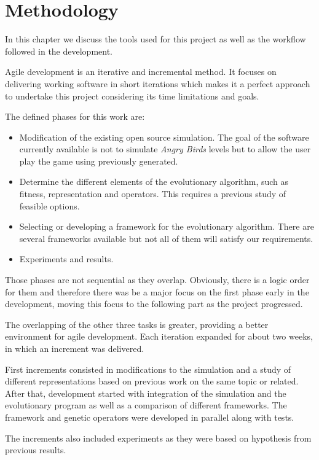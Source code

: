 \chapter{Methodology}\label{ch:workflow}

In this chapter we discuss the tools used for this project as well as the workflow followed in the development. 

Agile development is an iterative and incremental method. It focuses on delivering working software in short iterations which makes it a perfect approach to undertake this project considering its time limitations and goals.

The defined phases for this work are:
\begin{itemize}
	\item Modification of the existing open source simulation. The goal of the software currently available is not to simulate \textit{Angry Birds} levels but to allow the user play the game using previously generated. 
	\item Determine the different elements of the evolutionary algorithm, such as fitness, representation and operators. This requires a previous study of feasible options. 
	\item Selecting or developing a framework for the evolutionary algorithm. There are several frameworks available but not all of them will satisfy our requirements. 
	\item Experiments and results.
\end{itemize}

Those phases are not sequential as they overlap. Obviously, there is a logic order for them and therefore there was be a major focus on the first phase early in the development, moving this focus to the following part as the project progressed. 

The overlapping of the other three tasks is greater, providing a better environment for agile development. Each iteration expanded for about two weeks, in  which an increment was delivered. 

First increments consisted in modifications to the simulation and a study of different representations based on previous work on the same topic or related. After that, development started with integration of the simulation and the evolutionary program as well as a comparison of different frameworks. The framework and genetic operators were developed in parallel along with tests.

The increments also included experiments as they were based on hypothesis from previous results. 

